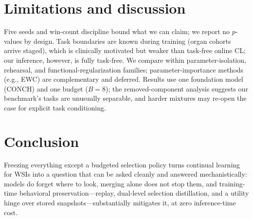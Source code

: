 \documentclass{article}
\begin{document}
\section{Limitations and discussion}
\label{sec:limitations}
Five seeds and win-count discipline bound what we can claim; we report no $p$-values by design. Task boundaries are known during training (organ cohorts arrive staged), which is clinically motivated but weaker than task-free online CL; our inference, however, is fully task-free. We compare within parameter-isolation, rehearsal, and functional-regularization families; parameter-importance methods (e.g., EWC) are complementary and deferred. Results use one foundation model (CONCH) and one budget ($B{=}8$); the removed-component analysis suggests our benchmark's tasks are unusually separable, and harder mixtures may re-open the case for explicit task conditioning.

\section{Conclusion}
\label{sec:conclusion}
Freezing everything except a budgeted selection policy turns continual learning for WSIs into a question that can be asked cleanly and answered mechanistically: models do forget where to look, merging alone does not stop them, and training-time behavioral preservation---replay, dual-level selection distillation, and a utility hinge over stored snapshots---substantially mitigates it, at zero inference-time cost.




\end{document}
